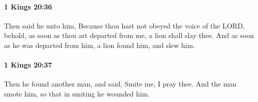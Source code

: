 		\paragraph{1 Kings 20:36} %
			\label{1KINGS-20-36}

			Then said he unto him, Because thou hast not obeyed the voice of the LORD, behold, as soon as thou art departed from me, a lion shall slay thee. And as soon as he was departed from him, a lion found him, and slew him.


		\paragraph{1 Kings 20:37} %
			\label{1KINGS-20-37}

			Then he found another man, and said, Smite me, I pray thee. And the man smote him, so that in smiting he wounded him.


